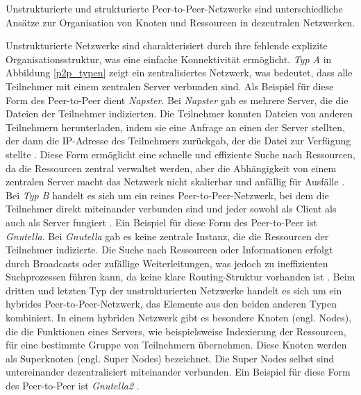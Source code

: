 \noindent Unstrukturierte und strukturierte Peer-to-Peer-Netzwerke sind unterschiedliche Ansätze zur Organisation von Knoten und Ressourcen in dezentralen Netzwerken. 

Unstrukturierte Netzwerke sind charakterisiert durch ihre fehlende explizite Organisationsstruktur, was eine einfache Konnektivität ermöglicht. \textit{Typ A} in Abbildung \ref{p2p_typen} zeigt ein zentralisiertes Netzwerk, was bedeutet, dass alle Teilnehmer mit einem zentralen Server verbunden sind. Als Beispiel für diese Form des Peer-to-Peer dient \textit{Napster}. Bei \textit{Napster} gab es mehrere Server, die die Dateien der Teilnehmer indizierten. Die Teilnehmer konnten Dateien von anderen Teilnehmern herunterladen, indem sie eine Anfrage an einen der Server stellten, der dann die IP-Adresse des Teilnehmers zurückgab, der die Datei zur Verfügung stellte \parencite[S. 171]{Saroiu_MeasuringAndAnalyzingNapsterAndGnutellaHosts}. Diese Form ermöglicht eine schnelle und effiziente Suche nach Ressourcen, da die Ressourcen zentral verwaltet werden, aber die Abhängigkeit von einem zentralen Server macht das Netzwerk nicht skalierbar und anfällig für Ausfälle \parencite[S. 732]{Khatibi_StructuredUnstructuredP2P}.
Bei \textit{Typ B} handelt es sich um ein reines Peer-to-Peer-Netzwerk, bei dem die Teilnehmer direkt miteinander verbunden sind und jeder sowohl als Client als auch als Server fungiert \parencite[S. 732]{Khatibi_StructuredUnstructuredP2P}. Ein Beispiel für diese Form des Peer-to-Peer ist \textit{Gnutella}. Bei \textit{Gnutella} gab es keine zentrale Instanz, die die Ressourcen der Teilnehmer indizierte. Die Suche nach Ressourcen oder Informationen erfolgt durch Broadcasts oder zufällige Weiterleitungen, was jedoch zu ineffizienten Suchprozessen führen kann, da keine klare Routing-Struktur vorhanden ist \parencite[S. 171]{Saroiu_MeasuringAndAnalyzingNapsterAndGnutellaHosts}. Beim dritten und letzten Typ der unstrukturierten Netzwerke handelt es sich um ein hybrides Peer-to-Peer-Netzwerk, das Elemente aus den beiden anderen Typen kombiniert. In einem hybriden Netzwerk gibt es besondere Knoten (engl. Nodes), die die Funktionen eines Servers, wie beispielsweise Indexierung der Ressourcen, für eine bestimmte Gruppe von Teilnehmern übernehmen. Diese Knoten werden als Superknoten (engl. Super Nodes) bezeichnet. Die Super Nodes selbst sind untereinander dezentralisiert miteinander verbunden. Ein Beispiel für diese Form des Peer-to-Peer ist \textit{Gnutella2} \parencite[S. 732]{Khatibi_StructuredUnstructuredP2P}. 

